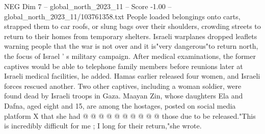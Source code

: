 \begin{textsample}{NEG Dim 7 – global\_north\_2023\_11 – Score -1.00 – global\_north\_2023\_11/103761358.txt}
People loaded belongings onto carts, strapped them to car roofs, or slung bags over their shoulders, crowding streets to return to their homes from temporary shelters.
Israeli warplanes dropped leaflets warning people that the war is not over and it is"very dangerous"to return north, the focus of Israel ' s military campaign.
After medical examinations, the former captives would be able to telephone family members before reunions later at Israeli medical facilities, he added.
Hamas earlier released four women, and Israeli forces rescued another.
Two other captives, including a woman soldier, were found dead by Israeli troops in Gaza.
Maayan Zin, whose daughters Ela and Dafna, aged eight and 15, are among the hostages, posted on social media platform X that she had @ @ @ @ @ @ @ @ @ @ those due to be released."This is incredibly difficult for me ; I long for their return,"she wrote.

\end{textsample}
